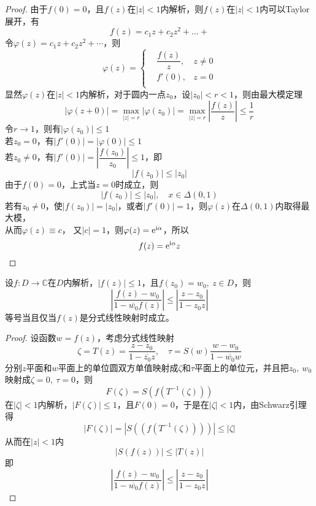 \begin{proof}
    
        
    由于$f(0) = 0$，且$f(z)$在$|z| < 1$内解析，则$f(z)$在$|z|<1$内可以\textup{Taylor}展开，有
    $$f(z) = c_1 z + c_2 z^2 + \dots + $$
    令$\varphi(z) =  c_1 z + c_2 z^2 + \cdots $，则
    $$
    \varphi(z) = 
    \left\{
        \begin{aligned}
            &\dfrac{f(z)}{z}, & z \neq 0\\
            &f'(0), & z = 0\\
        \end{aligned}
    \right.
    $$
    显然$\varphi(z)$在$|z| < 1$内解析，对于圆内一点$z_0$，设$|z_0| < r < 1$，则由最大模定理
    $$|\varphi(z+0)| = \max_{|z| = r}|\varphi(z_0)| = \max_{|z| = r}{\left| \dfrac{f(z)}{z}\right|} \leq \dfrac{1}{r}$$
    令$r \to 1$，则有$|\varphi(z_0)| \leq 1$\\
    若$z_0 = 0$，有$|f'(0)| = |\varphi(0)| \leq 1$\\
    若$z_0 \neq 0$，有$|f'(0)| = \left| \dfrac{f(z_0)}{z_0} \right| \leq 1$，即
    $$|f(z_0)| \leq |z_0|$$
    由于$f(0) = 0$，上式当$z=0$时成立，则
    $$|f(z_0)| \leq |z_0|,\quad x\in \Delta(0,1)$$
    若有$z_0 \neq 0$，使$|f(z_0)| = |z_0| $，或者$|f'(0)| = 1$，则$\varphi(z)$在$\Delta(0,1)$内取得最大模，\\
    从而$\varphi(z) \equiv c$， 又$|c| = 1$，则$\varphi(z) = \mathrm{e}^{\mathrm{i}\alpha}$，所以
    $$f(z) = \mathrm{e}^{\mathrm{i}\alpha}z$$

\end{proof}

\begin{theorem}

    设$f:D\to\mathbb{C}$在$D$内解析，$|f(z)| \leq 1$，且$f(z_0) = w_0,\ z\in D$，则
    $$ \left| \dfrac{f(z)-w_0}{1-\overline{w_0}f(z)}\right| \leq \left| \dfrac{z-z_0}{1 - z_0z}\right|$$
    等号当且仅当$f(z)$是分式线性映射时成立。

\end{theorem}

\begin{proof}
    
    设函数$w =f(z)$，考虑分式线性映射
    $$\zeta = T(z) = \dfrac{z - z_0}{1 - \overline{z_0}z},\quad \tau = S(w) \dfrac{w - w_0}{1 - \overline{w_0}w}$$
    分别$z$平面和$w$平面上的单位圆双方单值映射成$\zeta$和$\tau$平面上的单位元，并且把$z_0,\ w_0$映射成$\zeta = 0,\ \tau = 0$，则
    $$F(\zeta) = S(f(T^{-1}(\zeta)))$$
    在$|\zeta| < 1$内解析，$|F(\zeta)| \leq 1$，且$F(0) = 0$，于是在$|\zeta| < 1$内，由\textup{Schwarz}引理得
    $$|F(\zeta)| = |S((f(T^{-1}(\zeta))))| \leq |\zeta|$$
    从而在$|z|<1$内
    $$|S(f(z))| \leq |T(z)|$$
    即
    $$ \left| \dfrac{f(z)-w_0}{1-\overline{w_0}f(z)}\right| \leq \left| \dfrac{z-z_0}{1 - z_0z}\right|$$
    
\end{proof}